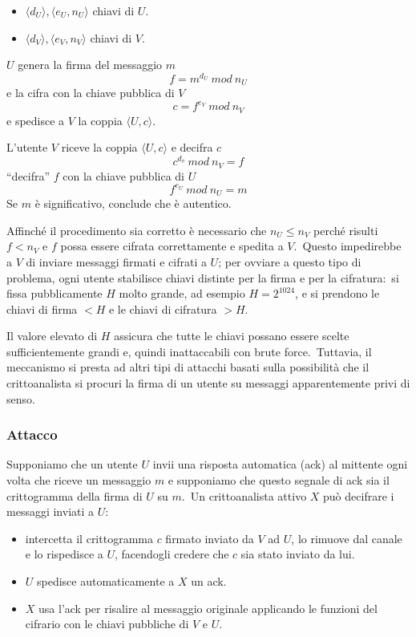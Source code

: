 \begin{itemize}
    \item $\langle d_U \rangle, \langle e_U, n_U\rangle$ chiavi di $U$.
    \item $\langle d_V \rangle, \langle e_V, n_V\rangle$ chiavi di $V$.
\end{itemize}

\noindent $U$ genera la firma del messaggio $m$
\[f=m^{d_U}\ \mathit{mod}\ n_U\] e la cifra con la chiave pubblica di $V$
\[c = f^{e_V}\ \mathit{mod}\ n_V\]
e spedisce a $V$ la coppia $\langle U, c \rangle$.

\vspace{12pt}
\noindent L'utente $V$ riceve la coppia $\langle U, c \rangle$ e decifra $c$
\[c^{d_v}\ \mathit{mod}\ n_V = f\]
``decifra'' $f$ con la chiave pubblica di $U$
\[f^{e_U}\ \mathit{mod}\ n_U = m\]
Se $m$ è significativo, conclude che è autentico.\
\vspace{12pt}

\noindent Affinché il procedimento sia corretto è necessario che $n_U \leq n_V$ perché risulti $f < n_V$ e $f$ possa essere cifrata correttamente e spedita a $V$.\
Questo impedirebbe a $V$ di inviare messaggi firmati e cifrati a $U$; per ovviare a questo tipo di problema, ogni utente stabilisce chiavi distinte per la firma e per la cifratura:\ si fissa pubblicamente $H$ molto grande, ad esempio $H = 2^{1024}$, e si prendono le chiavi di firma $< H$ e le chiavi di cifratura $> H$.\

Il valore elevato di $H$ assicura che tutte le chiavi possano essere scelte sufficientemente grandi e, quindi inattaccabili con brute force.\
Tuttavia, il meccanismo si presta ad altri tipi di attacchi basati sulla possibilità che il crittoanalista si procuri la firma di un utente su messaggi apparentemente privi di senso.\

\subsubsection{Attacco}

Supponiamo che un utente $U$ invii una risposta automatica (ack) al mittente ogni volta che riceve un messaggio $m$ e supponiamo che questo segnale di ack sia il crittogramma della firma di $U$ su $m$.\
Un crittoanalista attivo $X$ può decifrare i messaggi inviati a $U$:\

\begin{itemize}
    \item intercetta il crittogramma $c$ firmato inviato da $V$ ad $U$, lo rimuove dal canale e lo rispedisce a $U$, facendogli credere che $c$ sia stato inviato da lui.
    \item $U$ spedisce automaticamente a $X$ un ack.
    \item $X$ usa l'ack per risalire al messaggio originale applicando le funzioni del cifrario con le chiavi pubbliche di $V$ e $U$.
\end{itemize}

